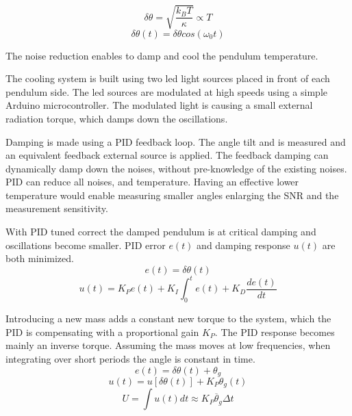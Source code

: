\documentclass[\main/master.tex]{subfiles}
\begin{document}
\begin{equation}
\delta\theta = \sqrt{\frac{k_BT}{\kappa}}\propto{T}  \label{eqn:radiation force}
\end{equation}
\begin{equation}
\delta\theta(t) = \delta\theta cos(\omega_0 t)   \label{eqn:pid_error}
\end{equation}
\par\noindent
The noise reduction enables to damp and cool the pendulum temperature. 
\par\noindent
The cooling system is built using two led light sources placed in front of each pendulum side. The led sources are modulated at high speeds using a simple Arduino microcontroller. The modulated light is causing a small external radiation torque, which damps down the oscillations.
\par\noindent
Damping is made using a PID feedback loop. The angle tilt and is measured and an equivalent feedback external source is applied. The feedback damping can dynamically damp down the noises, without pre-knowledge of the existing noises. PID can reduce all noises, and temperature. Having an effective lower temperature would enable measuring smaller angles enlarging the SNR and the measurement sensitivity.


\par\noindent
With PID tuned correct the damped pendulum is at critical damping and oscillations become smaller. PID error $e(t)$ and damping response $u(t)$ are both minimized. 
\begin{equation}
e(t) = \delta\theta(t)   \label{eqn:pid_error}
\end{equation}
\begin{equation}
u(t) = K_P e(t)+K_I\int_{0}^{t}e(t)+K_D\frac{de(t)}{dt}   \label{eqn:PID_eqn}
\end{equation}

\noindent
Introducing a new mass adds a constant new torque to the system, which the PID is compensating with a proportional gain $K_P$. The PID response becomes mainly an inverse torque. Assuming the mass moves at low frequencies, when integrating over short periods the angle is constant in time.
\begin{equation}
e(t) = \delta\theta(t) + \theta_g    \label{eqn:PID_measurement}
\end{equation}
\begin{equation}
u(t) = u[ \delta\theta(t)] + K_P\theta_g(t) \label{eqn:PID_measurement_eqn}
\end{equation}
\begin{equation}
U = \int u(t) dt  \approx K_P\overline{\theta}_g\Delta t \label{eqn:PID_measurement_eqn}
\end{equation}
\end{document}
